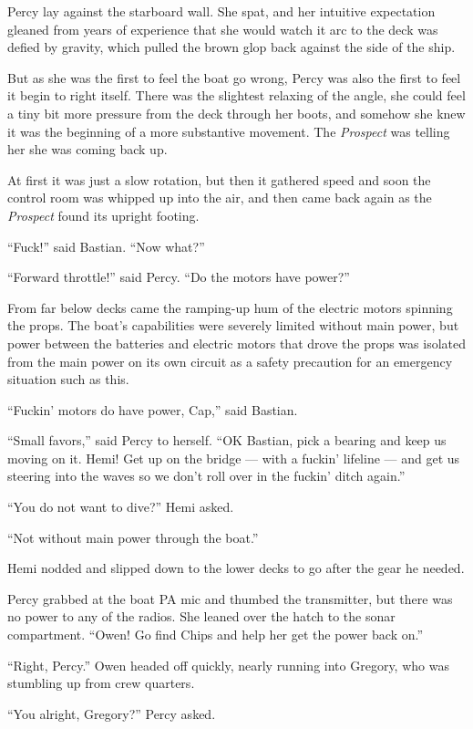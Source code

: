 \documentclass[
]{scrbook}
\begin{document}
Percy lay against the starboard wall. She spat, and her intuitive
expectation gleaned from years of experience that she would watch it arc
to the deck was defied by gravity, which pulled the brown glop back
against the side of the ship.

But as she was the first to feel the boat go wrong, Percy was also the
first to feel it begin to right itself. There was the slightest relaxing
of the angle, she could feel a tiny bit more pressure from the deck
through her boots, and somehow she knew it was the beginning of a more
substantive movement. The \emph{Prospect} was telling her she was coming
back up.

At first it was just a slow rotation, but then it gathered speed and
soon the control room was whipped up into the air, and then came back
again as the \emph{Prospect} found its upright footing.

``Fuck!'' said Bastian. ``Now what?''

``Forward throttle!'' said Percy. ``Do the motors have power?''

From far below decks came the ramping-up hum of the electric motors
spinning the props. The boat's capabilities were severely limited
without main power, but power between the batteries and electric motors
that drove the props was isolated from the main power on its own circuit
as a safety precaution for an emergency situation such as this.

``Fuckin' motors do have power, Cap,'' said Bastian.

``Small favors,'' said Percy to herself. ``OK Bastian, pick a bearing
and keep us moving on it. Hemi! Get up on the bridge --- with a fuckin'
lifeline --- and get us steering into the waves so we don't roll over in
the fuckin' ditch again.''

``You do not want to dive?'' Hemi asked.

``Not without main power through the boat.''

Hemi nodded and slipped down to the lower decks to go after the gear he
needed.

Percy grabbed at the boat PA mic and thumbed the transmitter, but there
was no power to any of the radios. She leaned over the hatch to the
sonar compartment. ``Owen! Go find Chips and help her get the power back
on.''

``Right, Percy.'' Owen headed off quickly, nearly running into Gregory,
who was stumbling up from crew quarters.

``You alright, Gregory?'' Percy asked.
\end{document}
